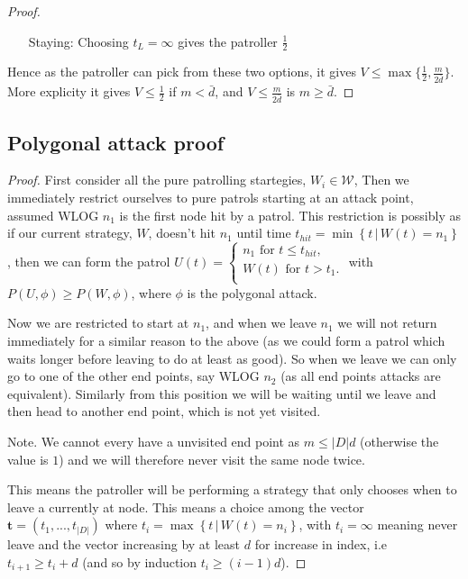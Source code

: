 \documentclass[a4paper,10pt]{article}
\newcommand{\set}[2]{\left\{ #1 \, | \, #2 \right\}}
\theoremstyle{definition}
\theoremstyle{definition}
\theoremstyle{remark}
\theoremstyle{definition}
\begin{document}
\begin{proof}
\begin{itemize}
\item[Staying:]Choosing $t_{L}=\infty$ gives the patroller $\frac{1}{2}$
\end{itemize}

Hence as the patroller can pick from these two options, it gives $V \leq \max\{\frac{1}{2} , \frac{m}{2\bar{d}} \}$. More explicity it gives $V \leq \frac{1}{2}$ if $m < \bar{d}$, and $V \leq \frac{m}{2\bar{d}}$ is $m \geq \bar{d}$.
\end{proof}

\subsection{Polygonal attack proof}
\label{Polygonal attack proof}

\begin{proof}
First consider all the pure patrolling startegies, $W_{i} \in \mathcal{W}$, Then we immediately restrict ourselves to pure patrols starting at an attack point, assumed WLOG $n_{1}$ is the first node hit by a patrol. This restriction is possibly as if our current strategy, $W$, doesn't hit $n_{1}$ until time $t_{hit}=\min \set{t}{W(t)=n_{1}}$, then we can form the patrol $U(t)=\left\{ \begin{array}{l} 
n_{1} \text{ for } t \leq t_{hit}, \\
W(t) \text{ for } t > t_{1}. \\
\end{array} \right. $ with $P(U,\phi) \geq P(W,\phi)$, where $\phi$ is the polygonal attack.

Now we are restricted to start at $n_{1}$, and when we leave $n_{1}$ we will not return immediately for a similar reason to the above (as we could form a patrol which waits longer before leaving to do at least as good). So when we leave we can only go to one of the other end points, say WLOG $n_{2}$ (as all end points attacks are equivalent). Similarly from this position we will be waiting until we leave and then head to another end point, which is not yet visited.

Note. We cannot every have a unvisited end point as $m \leq |D|d$ (otherwise the value is $1$) and we will therefore never visit the same node twice.

This means the patroller will be performing a strategy that only chooses when to leave a currently at node. This means a choice among the vector $\mathbf{t}=(t_{1},...,t_{|D|})$ where $t_{i}=\max \set{t}{W(t)=n_{i}}$, with $t_{i}=\infty$ meaning never leave and the vector increasing by at least $d$ for increase in index, i.e $t_{i+1} \geq t_{i}+d$ (and so by induction $t_{i} \geq (i-1)d$).


\end{proof}
\end{document}
